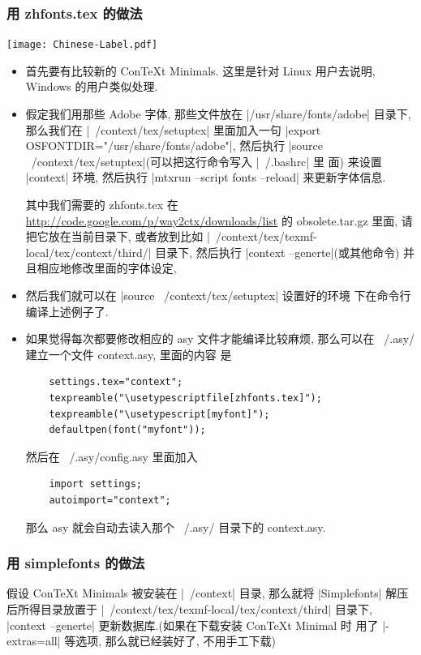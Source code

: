 \documentclass[nofonts,CJKnormalspaces]{ctexbook}
\begin{document}
\subsubsection{用 zhfonts.tex 的做法}
\begin{center}\texttt{[image: Chinese-Label.pdf]}\end{center}%

\begin{itemize}
\item 首先要有比较新的 ConTeXt  Minimals. 这里是针对 Linux 用户去说明,
  Windows 的用户类似处理.

\item 假定我们用那些 Adobe 字体, 那些文件放在 |/usr/share/fonts/adobe|
  目录下, 那么我们在   |~/context/tex/setuptex| 里面加入一句
  |export  OSFONTDIR="/usr/share/fonts/adobe"|, 然后执行
  |source  ~/context/tex/setuptex|(可以把这行命令写入 |~/.bashrc| 里
  面) 来设置 |context| 环境, 然后执行
  |mtxrun --script fonts --reload| 来更新字体信息.

  其中我们需要的 zhfonts.tex 在
  \url{http://code.google.com/p/way2ctx/downloads/list} 的
  obsolete.tar.gz 里面, 请把它放在当前目录下, 或者放到比如
  |~/context/tex/texmf-local/tex/context/third/| 目录下, 然后执行
  |context --generte|(或其他命令) 并且相应地修改里面的字体设定,

\item  然后我们就可以在 |source  ~/context/tex/setuptex| 设置好的环境
  下在命令行编译上述例子了.
\item 如果觉得每次都要修改相应的 asy 文件才能编译比较麻烦, 那么可以在
  ~/.asy/ 建立一个文件 context.asy, 里面的内容
  是  \label{ConTeXt:Settings}
  \begin{lstlisting}
    settings.tex="context";
    texpreamble("\usetypescriptfile[zhfonts.tex]");
    texpreamble("\usetypescript[myfont]");
    defaultpen(font("myfont"));
  \end{lstlisting}
  然后在 ~/.asy/config.asy 里面加入
  \begin{lstlisting}
    import settings;
    autoimport="context";
  \end{lstlisting}
  那么 asy 就会自动去读入那个 ~/.asy/ 目录下的 context.asy.
\end{itemize}
\subsubsection{用 simplefonts 的做法}
假设 ConTeXt Minimals 被安装在 |~/context| 目录, 那么就将
|Simplefonts| 解压后所得目录放置于
|~/context/tex/texmf-local/tex/context/third| 目录下,
|context --generte| 更新数据库.(如果在下载安装 ConTeXt Minimal 时
用了 |-extras=all| 等选项, 那么就已经装好了, 不用手工下载)
\end{document}
